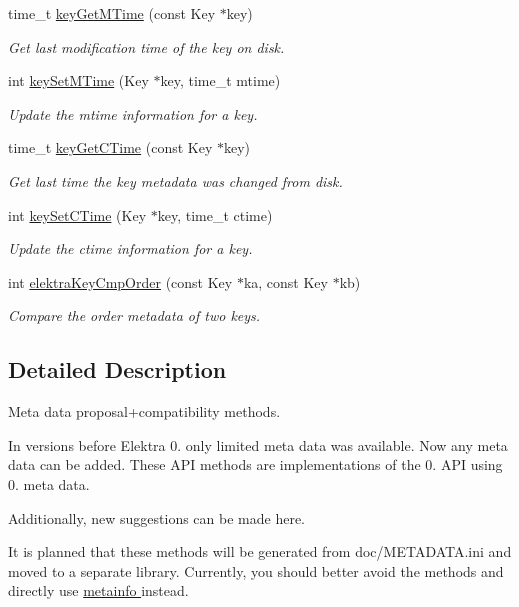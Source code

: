 \begin{DoxyCompactItemize}
time\+\_\+t \hyperlink{group__meta_ga57689eb5691679071463b777ae786ae9}{key\+Get\+M\+Time} (const Key $\ast$key)
\begin{DoxyCompactList}\small\item\em Get last modification time of the key on disk. \end{DoxyCompactList}\item 
int \hyperlink{group__meta_ga481d8997187992fe4bbf288bc8ef4db7}{key\+Set\+M\+Time} (Key $\ast$key, time\+\_\+t mtime)
\begin{DoxyCompactList}\small\item\em Update the mtime information for a key. \end{DoxyCompactList}\item 
time\+\_\+t \hyperlink{group__meta_ga2c213c120cbe02201278ef7fb8cd94be}{key\+Get\+C\+Time} (const Key $\ast$key)
\begin{DoxyCompactList}\small\item\em Get last time the key metadata was changed from disk. \end{DoxyCompactList}\item 
int \hyperlink{group__meta_ga9f502ecab8ab43f0b17220fcc95f3fa5}{key\+Set\+C\+Time} (Key $\ast$key, time\+\_\+t ctime)
\begin{DoxyCompactList}\small\item\em Update the ctime information for a key. \end{DoxyCompactList}\item 
int \hyperlink{group__meta_gab8b30dfabb0867bd6899e60e7bd193a2}{elektra\+Key\+Cmp\+Order} (const Key $\ast$ka, const Key $\ast$kb)
\begin{DoxyCompactList}\small\item\em Compare the order metadata of two keys. \end{DoxyCompactList}\end{DoxyCompactItemize}


\subsection{Detailed Description}
Meta data proposal+compatibility methods. 

In versions before Elektra 0. only limited meta data was available. Now any meta data can be added. These A\+P\+I methods are implementations of the 0. A\+P\+I using 0. meta data.

Additionally, new suggestions can be made here.

It is planned that these methods will be generated from doc/\+M\+E\+T\+A\+D\+A\+T\+A.\+ini and moved to a separate library. Currently, you should better avoid the methods and directly use \hyperlink{group__keymeta}{metainfo } instead. 

